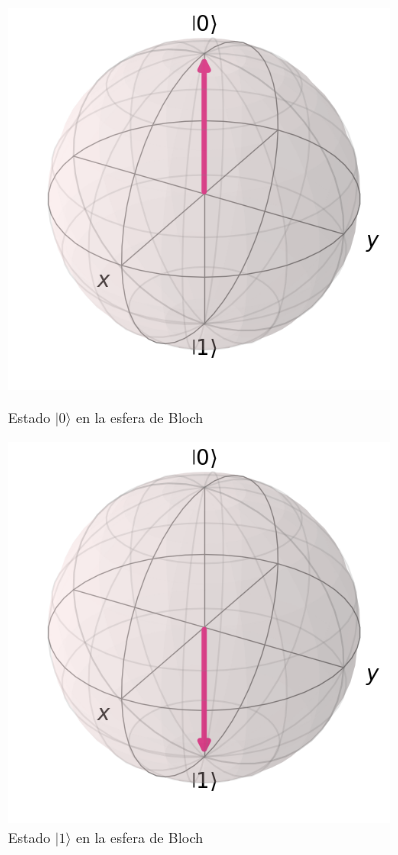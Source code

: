 \documentclass{article}
\numberwithin{equation}{section} %
\begin{document}
    \begin{figure}[h!]
        \centering
        \begin{minipage}[b]{0.4\textwidth}
            \centering
            \includegraphics[width=0.9\textwidth]{img/bloch_state_0.png}
            \caption{Estado $|0\rangle$ en la esfera de Bloch}\label{fig: bloch0}
        \end{minipage}
        \hspace{0.05\textwidth}
        \begin{minipage}[b]{0.4\textwidth}
            \centering
            \includegraphics[width=0.9\textwidth]{img/bloch_state_1.png}
            \caption{Estado $|1\rangle$ en la esfera de Bloch}\label{fig: bloch1}
        \end{minipage}
    
    \end{figure}
    
\end{document}
